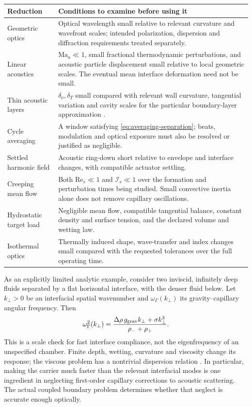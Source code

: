 \begin{longtable}{@{}>{\raggedright\arraybackslash}p{34mm}p{111mm}@{}}
\toprule Reduction & Conditions to examine before using it \\\midrule\endhead
Geometric optics & Optical wavelength small relative to relevant curvature
and wavefront scales; intended polarization, dispersion and diffraction
requirements treated separately.\\
Linear acoustics & $\mathrm{Ma}_a\ll1$, small fractional thermodynamic
perturbations, and acoustic particle displacement small relative to local
geometric scales. The eventual mean interface deformation need not be small.\\
Thin acoustic layers & $\delta_\nu,\delta_T$ small compared with relevant wall
curvature, tangential variation and cavity scales for the particular
boundary-layer approximation \cite{bach2018,jorgensen2021}.\\
Cycle averaging & A window satisfying \cref{eq:averaging-separation}; beats,
modulation and optical exposure must also be resolved or justified as negligible.\\
Settled harmonic field & Acoustic ring-down short relative to envelope and
interface changes, with compatible actuator settling.\\
Creeping mean flow & Both $\mathrm{Re}_s\ll1$ and $\mathcal I_s\ll1$ over the
formation and perturbation times being studied. Small convective inertia
alone does not remove capillary oscillations.\\
Hydrostatic target load & Negligible mean flow, compatible tangential balance,
constant density and surface tension, and the declared volume and wetting law.\\
Isothermal optics & Thermally induced shape, wave-transfer and index changes
small compared with the requested tolerances over the full operating time.\\
\bottomrule
\end{longtable}

As an explicitly limited analytic example, consider two inviscid, infinitely
deep fluids separated by a flat horizontal interface, with the denser fluid
below. Let $k_\perp>0$ be an interfacial spatial wavenumber and
$\omega_\Gamma(k_\perp)$ its gravity--capillary angular frequency. Then
\begin{equation}
 \omega_\Gamma^2(k_\perp)
   =\frac{\Delta\rho\,g_{\rm grav}k_\perp+\sigma k_\perp^3}{\rho_-+\rho_+}.
 \label{eq:inviscid-capillary-limit}
\end{equation}
This is a scale check for fast interface compliance, not the eigenfrequency
of an unspecified chamber. Finite depth, wetting, curvature and viscosity
change its response; the viscous problem has a nontrivial dispersion relation
\cite{denner2016}. In particular, making the carrier much faster than the
relevant interfacial modes is one ingredient in neglecting first-order
capillary corrections to acoustic scattering. The actual coupled boundary
problem determines whether that neglect is accurate enough optically.

